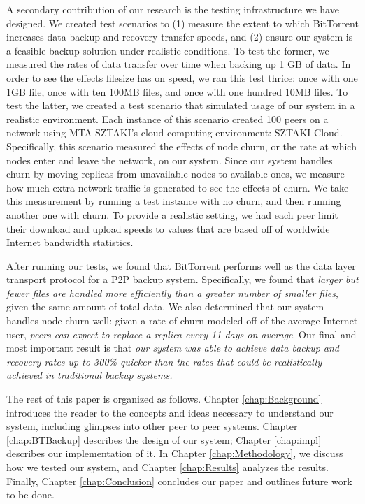 \documentclass[12pt]{report}
\begin{document}
A secondary contribution of our research is the testing infrastructure we have designed. We created test scenarios to (1) measure the extent to which BitTorrent increases data backup and recovery transfer speeds, and (2) ensure our system is a feasible backup solution under realistic conditions. To test the former, we measured the rates of data transfer over time when backing up 1 GB of data. In order to see the effects filesize has on speed, we ran this test thrice: once with one 1GB file, once with ten 100MB files, and once with one hundred 10MB files. To test the latter, we created a test scenario that simulated usage of our system in a realistic environment. Each instance of this scenario created 100 peers on a network using MTA SZTAKI's cloud computing environment: SZTAKI Cloud. Specifically, this scenario measured the effects of node churn, or the rate at which nodes enter and leave the network, on our system. Since our system handles churn by moving replicas from unavailable nodes to available ones, we measure how much extra network traffic is generated to see the effects of churn. We take this measurement by running a test instance with no churn, and then running another one with churn. To provide a realistic setting, we had each peer limit their download and upload speeds to values that are based off of worldwide Internet bandwidth statistics.

After running our tests, we found that BitTorrent performs well as the data layer transport protocol for a P2P backup system. Specifically, we found that \emph{larger but fewer files are handled more efficiently than a greater number of smaller files}, given the same amount of total data. We also determined that our system handles node churn well: given a rate of churn modeled off of the average Internet user, \emph{peers can expect to replace a replica every 11 days on average}. Our final and most important result is that \emph{our system was able to achieve data backup and recovery rates up to \~300\% quicker than the rates that could be realistically achieved in traditional backup systems.}

The rest of this paper is organized as follows. Chapter \ref{chap:Background} introduces the reader to the concepts and ideas necessary to understand our system, including glimpses into other peer to peer systems. Chapter \ref{chap:BTBackup} describes the design of our system; Chapter \ref{chap:impl} describes our implementation of it. In Chapter \ref{chap:Methodology}, we discuss how we tested our system, and Chapter \ref{chap:Results} analyzes the results. Finally, Chapter \ref{chap:Conclusion} concludes our paper and outlines future work to be done.
\end{document}
